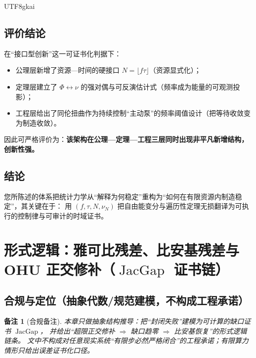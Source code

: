 \documentclass[12pt]{article}
\newtheorem{remark}{备注}[section]
\newcommand{\JacGap}{\operatorname{JacGap}}
\begin{document}
\begin{CJK*}{UTF8}{gkai}
\subsection{评价结论}
\label{subsec:tex27-ch23-summary}

在“接口型创新”这一可证书化判据下：
\begin{itemize}
  \item 公理层新增了资源—时间的硬接口 $N=\lfloor f\tau\rfloor$（资源显式化）；
  \item 定理层建立了 $\Phi \leftrightarrow \nu$ 的强对偶与可反演估计式（频率成为能量的可观测投影）；
  \item 工程层给出了同伦扭曲作为持续控制“主动泵”的频率阈值设计（把等待收敛变为制造收敛）。
\end{itemize}
因此可严格评价为：\textbf{该架构在公理—定理—工程三层同时出现非平凡新增结构，创新性强。}

\subsection{结论}
\label{subsec:tex27-ch23-conclusion}

您所陈述的体系把统计力学从“解释为何稳定”重构为“如何在有限资源内制造稳定”，其关键在于：
用 $(f,\tau,N,\nu_N)$ 把自由能变分与遍历性定理无损翻译为可执行的控制律与可审计的时域证书。

\clearpage

\section{形式逻辑：雅可比残差、比安基残差与 OHU 正交修补（\texorpdfstring{$\JacGap$}{JacGap} 证书链）}
\label{sec:tex27-ch24-jacobiator-bianchi-ohu}

\subsection{合规与定位（抽象代数/规范建模，不构成工程承诺）}
\label{subsec:tex27-ch24-compliance}

\begin{remark}[合规备注]
本章只做抽象结构推导：把“封闭失败”建模为可计算的缺口证书 $\JacGap$，
并给出“超限正交修补 $\Rightarrow$ 缺口趋零 $\Rightarrow$ 比安基恢复”的形式逻辑链条。
文中不构成对任意现实系统“有限步必然严格闭合”的工程承诺；有限算力情形只给出误差证书化口径。
\end{remark}


\end{CJK*}
\end{document}
